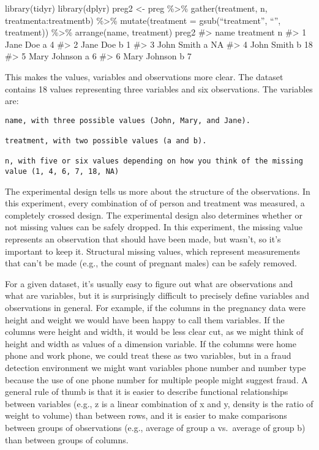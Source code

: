 \documentclass[]{article}
\begin{document}
library(tidyr) library(dplyr) preg2 \textless{}- preg \%\textgreater{}\%
gather(treatment, n, treatmenta:treatmentb) \%\textgreater{}\%
mutate(treatment = gsub(``treatment'', ``'', treatment))
\%\textgreater{}\% arrange(name, treatment) preg2 \#\textgreater{} name
treatment n \#\textgreater{} 1 Jane Doe a 4 \#\textgreater{} 2 Jane Doe
b 1 \#\textgreater{} 3 John Smith a NA \#\textgreater{} 4 John Smith b
18 \#\textgreater{} 5 Mary Johnson a 6 \#\textgreater{} 6 Mary Johnson b
7

This makes the values, variables and observations more clear. The
dataset contains 18 values representing three variables and six
observations. The variables are:

\begin{verbatim}
name, with three possible values (John, Mary, and Jane).

treatment, with two possible values (a and b).

n, with five or six values depending on how you think of the missing value (1, 4, 6, 7, 18, NA)
\end{verbatim}

The experimental design tells us more about the structure of the
observations. In this experiment, every combination of of person and
treatment was measured, a completely crossed design. The experimental
design also determines whether or not missing values can be safely
dropped. In this experiment, the missing value represents an observation
that should have been made, but wasn't, so it's important to keep it.
Structural missing values, which represent measurements that can't be
made (e.g., the count of pregnant males) can be safely removed.

For a given dataset, it's usually easy to figure out what are
observations and what are variables, but it is surprisingly difficult to
precisely define variables and observations in general. For example, if
the columns in the pregnancy data were height and weight we would have
been happy to call them variables. If the columns were height and width,
it would be less clear cut, as we might think of height and width as
values of a dimension variable. If the columns were home phone and work
phone, we could treat these as two variables, but in a fraud detection
environment we might want variables phone number and number type because
the use of one phone number for multiple people might suggest fraud. A
general rule of thumb is that it is easier to describe functional
relationships between variables (e.g., z is a linear combination of x
and y, density is the ratio of weight to volume) than between rows, and
it is easier to make comparisons between groups of observations (e.g.,
average of group a vs.~average of group b) than between groups of
columns.
\end{document}
